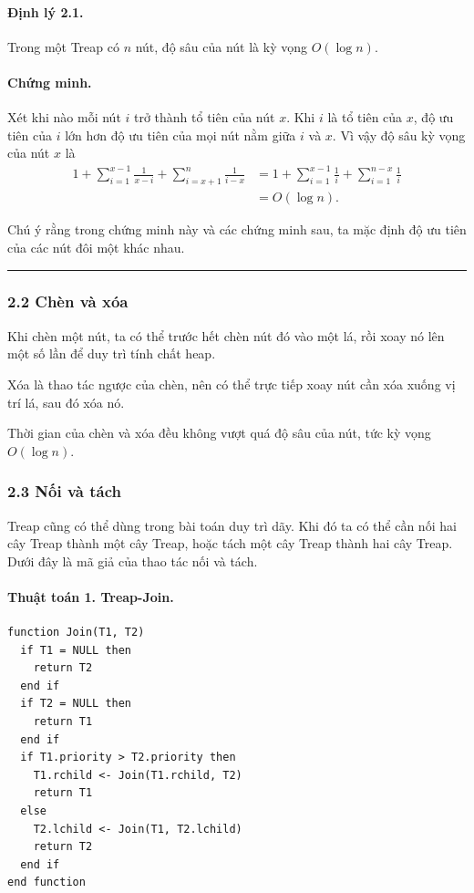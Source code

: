 \documentclass[11pt]{article}
\newcommand{\qedmark}{\hfill\rule{0.7ex}{0.7ex}}
\begin{document}
\paragraph{Định lý 2.1.}
Trong một Treap có \(n\) nút, độ sâu của nút là kỳ vọng \(O(\log n)\).

\paragraph{Chứng minh.}
Xét khi nào mỗi nút \(i\) trở thành tổ tiên của nút \(x\). Khi \(i\) là tổ tiên
của \(x\), độ ưu tiên của \(i\) lớn hơn độ ưu tiên của mọi nút nằm giữa \(i\)
và \(x\). Vì vậy độ sâu kỳ vọng của nút \(x\) là
\[
\begin{aligned}
  1+\sum_{i=1}^{x-1}\frac{1}{x-i}+\sum_{i=x+1}^{n}\frac{1}{i-x}
  &=1+\sum_{i=1}^{x-1}\frac{1}{i}+\sum_{i=1}^{n-x}\frac{1}{i}\\
  &=O(\log n).
\end{aligned}
\]

Chú ý rằng trong chứng minh này và các chứng minh sau, ta mặc định độ ưu tiên
của các nút đôi một khác nhau. \qedmark

\subsubsection*{2.2 Chèn và xóa}

Khi chèn một nút, ta có thể trước hết chèn nút đó vào một lá, rồi xoay nó lên
một số lần để duy trì tính chất heap.

Xóa là thao tác ngược của chèn, nên có thể trực tiếp xoay nút cần xóa xuống vị
trí lá, sau đó xóa nó.

Thời gian của chèn và xóa đều không vượt quá độ sâu của nút, tức kỳ vọng
\(O(\log n)\).

\subsubsection*{2.3 Nối và tách}

Treap cũng có thể dùng trong bài toán duy trì dãy. Khi đó ta có thể cần nối hai
cây Treap thành một cây Treap, hoặc tách một cây Treap thành hai cây Treap.
Dưới đây là mã giả của thao tác nối và tách.

\paragraph{Thuật toán 1. Treap-Join.}
\begin{verbatim}
function Join(T1, T2)
  if T1 = NULL then
    return T2
  end if
  if T2 = NULL then
    return T1
  end if
  if T1.priority > T2.priority then
    T1.rchild <- Join(T1.rchild, T2)
    return T1
  else
    T2.lchild <- Join(T1, T2.lchild)
    return T2
  end if
end function
\end{verbatim}
\end{document}
